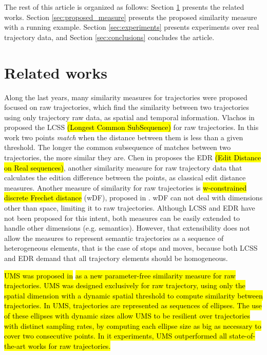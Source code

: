 \documentclass[12pt]{article}
\begin{document}
The rest of this article is organized as follows: Section \ref{sec:related} presents the related works. Section \ref{sec:proposed_measure} presents the proposed similarity measure with a running example. Section \ref{sec:experiments} presents experiments over real trajectory data, and Section \ref{sec:conclusions} concludes the article.

\section{Related works} \label{sec:related}
Along the last years, many similarity measures for trajectories were proposed focused on raw trajectories, which find the similarity between two trajectories using only trajectory raw data, as spatial and temporal information. Vlachos in \cite{vlachos2002discovering} proposed the LCSS \hl{(Longest Common SubSequence)} for raw trajectories. In this work two points \textit{match} when the distance between them is less than a given threshold. The longer the common subsequence of matches between two trajectories, the more similar they are. Chen in \cite{Chen:2005:RFS:1066157.1066213} proposes the EDR \hl{(Edit Distance on Real sequences)}, another similarity measure for raw trajectory data that calculates the edition difference between the points, as classical edit distance measures. Another measure of similarity for raw trajectories is \hl{w-constrained discrete Frechet distance} (wDF), proposed in \cite{Ding:2008:ESJ:1440463.1440989}. wDF can not deal with dimensions other than space, limiting it to raw trajectories. Although LCSS and EDR have not been proposed for this intent, both measures can be easily extended to handle other dimensions (e.g. semantics). However, that extensibility does not allow the measures to represent semantic trajectories as a sequence of heterogeneous elements, that is the case of stops and moves, because both LCSS and EDR demand that all trajectory elements should be homogeneous.

\hl{UMS was proposed in }\cite{Furtado-UMS-2018}\hl{ as a new parameter-free similarity measure for raw trajectories. UMS was designed exclusively for raw trajectory, using only the spatial dimension with a dynamic spatial threshold to compute similarity between trajectories. In UMS, trajectories are represented as sequences of ellipses. The use of these ellipses with dynamic sizes allow UMS to be resilient over trajectories with distinct sampling rates, by computing each ellipse size as big as necessary to cover two consecutive points. In it experiments, UMS outperformed all state-of-the-art works for raw trajectories.}
\end{document}
